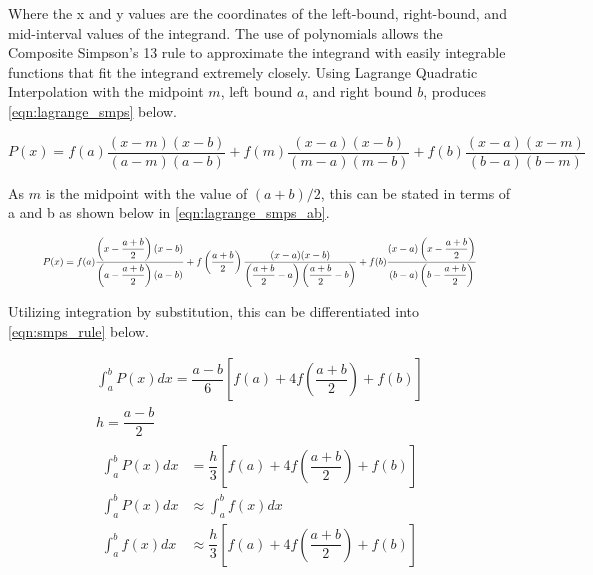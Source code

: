 \documentclass{paper}
\begin{document}
Where the x and y values are the coordinates of the left-bound, right-bound, and mid-interval values of the integrand.
The use of polynomials allows the Composite Simpson's 13 rule to approximate the integrand with easily integrable functions that fit the integrand extremely closely.
Using Lagrange Quadratic Interpolation with the midpoint \(m\), left bound \(a\), and right bound \(b\), produces \eqref{eqn:lagrange_smps} below.

\begin{equation}
    \label{eqn:lagrange_smps}
    P(x) = f(a) \dfrac{(x - m)(x - b)}{(a - m)(a - b)} + f(m) \dfrac{(x - a)(x - b)}{(m - a)(m - b)} + f(b) \dfrac{(x - a)(x - m)}{(b - a)(b - m)}
\end{equation}

As \(m\) is the midpoint with the value of \((a + b) / 2\), this can be stated in terms of a and b as shown below in \eqref{eqn:lagrange_smps_ab}.

\begin{equation}
    \label{eqn:lagrange_smps_ab}
    \resizebox{.9\textwidth}{!} 
    {$
    P(x) = f(a) \dfrac{\left(x - \dfrac{a+b}{2}\right)(x - b)}{\left(a - \dfrac{a+b}{2}\right)(a - b)} + f\left(\dfrac{a+b}{2}\right) \dfrac{(x - a)(x - b)}{\left(\dfrac{a+b}{2} - a\right)\left(\dfrac{a+b}{2} - b\right)} + f(b) \dfrac{(x - a)\left(x - \dfrac{a+b}{2}\right)}{(b - a)\left(b - \dfrac{a+b}{2}\right)}
    $}
\end{equation}

Utilizing integration by substitution, this can be differentiated into \eqref{eqn:smps_rule} below.

\begin{equation}
    \label{eqn:smps_rule}
    \begin{gathered}
    \int_a^b P(x) dx = \dfrac{a - b}{6} \left[f(a) + 4f\left(\dfrac{a + b}{2}\right) + f(b)\right]          \\
    h = \dfrac{a - b}{2}                                                                                    \\
    \begin{aligned}
        \int_a^b P(x) dx &= \dfrac{h}{3} \left[f(a) + 4f\left(\dfrac{a + b}{2}\right) + f(b)\right]         \\
        \int_a^b P(x) dx &\approx \int_a^b f(x) dx                                                          \\
        \int_a^b f(x) dx &\approx \dfrac{h}{3} \left[f(a) + 4f\left(\dfrac{a + b}{2}\right) + f(b)\right]   \\
    \end{aligned}
\end{gathered}
\end{equation}
\end{document}
